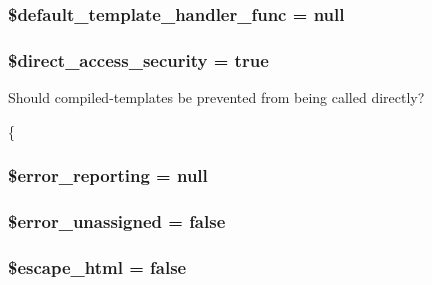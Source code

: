 \subsubsection[{\$default\+\_\+template\+\_\+handler\+\_\+func}]{\setlength{\rightskip}{0pt plus 5cm}\$default\+\_\+template\+\_\+handler\+\_\+func = null}\label{class_smarty_a9ff3231160bde6632ca8ad252918e3f0}
\hypertarget{class_smarty_a96c1c358ebd9cd14712b305f6baed2ff}{}
\subsubsection[{\$direct\+\_\+access\+\_\+security}]{\setlength{\rightskip}{0pt plus 5cm}\$direct\+\_\+access\+\_\+security = true}\label{class_smarty_a96c1c358ebd9cd14712b305f6baed2ff}
Should compiled-\/templates be prevented from being called directly?

\{ \hypertarget{class_smarty_ad3fc8af82ab7da1fd9dc868b28938698}{}
\subsubsection[{\$error\+\_\+reporting}]{\setlength{\rightskip}{0pt plus 5cm}\$error\+\_\+reporting = null}\label{class_smarty_ad3fc8af82ab7da1fd9dc868b28938698}
\hypertarget{class_smarty_aaccca4d5f12266dfc813b9ebe920d4e0}{}
\subsubsection[{\$error\+\_\+unassigned}]{\setlength{\rightskip}{0pt plus 5cm}\$error\+\_\+unassigned = false}\label{class_smarty_aaccca4d5f12266dfc813b9ebe920d4e0}
\hypertarget{class_smarty_aba969aea1cf350a91f5eaf44b48daa56}{}
\subsubsection[{\$escape\+\_\+html}]{\setlength{\rightskip}{0pt plus 5cm}\$escape\+\_\+html = false}\label{class_smarty_aba969aea1cf350a91f5eaf44b48daa56}
\hypertarget{class_smarty_a57e14bd7397e4236311ab75677092bbc}{}
